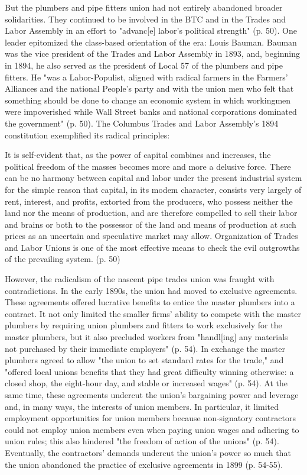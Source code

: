 \documentclass[12pt]{article}
\renewenvironment{quote}
  {\list{}{\leftmargin=\parindent\rightmargin=0pt}%
   \item\relax}
  {\endlist}
\begin{document}
But the plumbers and pipe fitters union had not entirely abandoned broader solidarities. They continued to be involved in the BTC and in the Trades and Labor Assembly in an effort to "advanc[e] labor’s political strength" (p. 50). One leader epitomized the class-based orientation of the era: Louis Bauman. Bauman was the vice president of the Trades and Labor Assembly in 1893, and, beginning in 1894, he also served as the president of Local 57 of the plumbers and pipe fitters. He "was a Labor-Populist, aligned with radical farmers in the Farmers’ Alliances and the national People’s party and with the union men who felt that something should be done to change an economic system in which workingmen were impoverished while Wall Street banks and national corporations dominated the government" (p. 50). The Columbus Trades and Labor Assembly’s 1894 constitution exemplified its radical principles:

\begin{quote}
	It is self-evident that, as the power of capital combines and increases, the political freedom of the masses becomes more and more a delusive force. There can be no harmony between capital and labor under the present industrial system for the simple reason that capital, in its modem character, consists very largely of rent, interest, and profits, extorted from the producers, who possess neither the land nor the means of production, and are therefore compelled to sell their labor and brains or both to the possessor of the land and means of production at such prices as an uncertain and speculative market may allow. Organization of Trades and Labor Unions is one of the most effective means to check the evil outgrowths of the prevailing system. (p. 50)
\end{quote}

However, the radicalism of the nascent pipe trades union was fraught with contradictions. In the early 1890s, the union had moved to exclusive agreements. These agreements offered lucrative benefits to entice the master plumbers into a contract. It not only limited the smaller firms’ ability to compete with the master plumbers by requiring union plumbers and fitters to work exclusively for the master plumbers, but it also precluded workers from "handl[ing] any materials not purchased by their immediate employers" (p. 54). In exchange the master plumbers agreed to allow "the union to set standard rates for the trade," and "offered local unions benefits that they had great difficulty winning otherwise: a closed shop, the eight-hour day, and stable or increased wages" (p. 54). At the same time, these agreements undercut the union’s bargaining power and leverage and, in many ways, the interests of union members. In particular, it limited employment opportunities for union members because non-signatory contractors could not employ union members even when paying union wages and adhering to union rules; this also hindered "the freedom of action of the unions" (p. 54). Eventually, the contractors’ demands undercut the union’s power so much that the union abandoned the practice of exclusive agreements in 1899 (p. 54-55).
\end{document}
